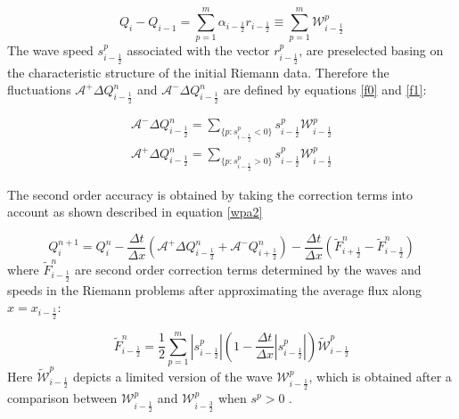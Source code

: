 \documentclass[11pt,a4paper]{article}
\begin{document}
\begin{equation}
	Q_{i} -  Q_{i-1} = \sum_{p=1}^{m}  \alpha_{i-\frac{1}{2}} r_{i-\frac{1}{2}} \equiv \sum_{p=1}^{m} \mathcal{W}_{i-\frac{1}{2}}^{p}
	\label{wpa19}
\end{equation}
The wave speed $s_{i-\frac{1}{2}}^{p}$ associated with the vector $r_{i-\frac{1}{2}}^{p}$, are preselected basing on the characteristic structure of the initial Riemann data. Therefore the fluctuations $\mathcal{A^{+}}\Delta Q_{i-\frac{1}{2}}^{n}$  and $\mathcal{A^{-}}\Delta Q_{i-\frac{1}{2}}^{n} $ are defined by equations \eqref{f0} and \eqref{f1}:

\begin{eqnarray}
	\mathcal{A^{-}}\Delta Q_{i-\frac{1}{2}}^{n} = \sum_{\{ p:s_{i-\frac{1}{2}}^{p}<0\}} s_{i-\frac{1}{2}}^{p} \mathcal{W}_{i-\frac{1}{2}}^{p}
	\label{f0}\\
	\mathcal{A^{+}}\Delta Q_{i-\frac{1}{2}}^{n} =\sum_{\{ p:s_{i-\frac{1}{2}}^{p}>0\}} s_{i-\frac{1}{2}}^{p} \mathcal{W}_{i-\frac{1}{2}}^{p}
	\label{f1}
\end{eqnarray}

	The second order accuracy is obtained by taking the correction terms into account as shown described in equation \eqref{wpa2} 

\begin{equation}
	Q_{i}^{n+1} =  Q_{i}^{n} - \frac{\Delta t}{\Delta x}(\mathcal{A^{+}}\Delta 	Q_{i-\frac{1}{2}}^{n} + \mathcal{A^{-}}Q_{i+\frac{1}{2}}^{n}) -  \frac{\Delta t}{\Delta x} (\tilde{F}_{i+\frac{1}{2}}^{n} - \tilde{F}_{i-\frac{1}{2}}^{n} )
	\label{wpa2}
\end{equation}
where $\tilde{F}_{i-\frac{1}{2}}^{n} $ are second order correction terms determined by the waves and speeds in the Riemann problems after approximating the average flux along  $x = x_{i - \frac{1}{2}}$:

\begin{equation}
	\tilde{F}_{i-\frac{1}{2}}^{n} = \frac{1}{2} \sum_{p=1}^{m}  |s_{i- \frac{1}{2}}^{p}| \left( 1 - \frac{\Delta t}{\Delta x} |s_{i- \frac{1}{2}}^{p}|\right) \tilde{\mathcal{W}}_{i-\frac{1}{2}}^{p} 
	\label{wpa13}
\end{equation}
Here $\tilde{\mathcal{W}}_{i-\frac{1}{2}}^{p} $ depicts a limited version of the wave $\mathcal{W}_{i-\frac{1}{2}}^{p} $, which is obtained after a comparison between $\mathcal{W}_{i-\frac{1}{2}}^{p} $ and $\mathcal{W}_{i-\frac{3}{2}}^{p} $ when $s^{p} >0$ \cite{le:1997}.
\end{document}
